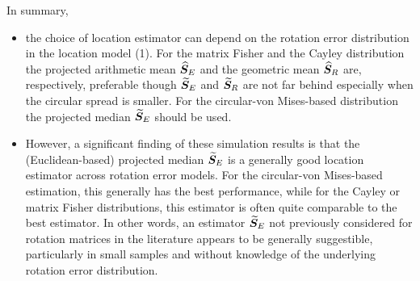 In summary,
\begin{itemize}
\item the choice of location estimator can depend on the rotation error distribution in the location model (1).  For the matrix Fisher and the Cayley distribution  the projected arithmetic mean ${\widehat{\bm S}_E}$ and the geometric mean ${\widehat{\bm S}_R}$ are, respectively, preferable though ${\widetilde{\bm S}_E}$ and ${\widetilde{\bm S}_R}$ are not far behind especially when the circular spread is smaller. For the circular-von Mises-based distribution  the projected median ${\widetilde{\bm S}_E}$  should be used.

\item  However, a significant finding of these simulation results is that the (Euclidean-based)  projected median ${\widetilde{\bm S}_E}$ is a generally good location estimator across rotation error models.  For the circular-von Mises-based estimation, this generally has the best performance, while for the Cayley or matrix Fisher distributions, this estimator is often quite comparable to the best estimator.  In other words, an estimator ${\widetilde{\bm S}_E}$ not previously considered for rotation matrices in the literature appears to be generally suggestible, particularly in small samples and without knowledge of the underlying rotation error distribution.

\end{itemize}